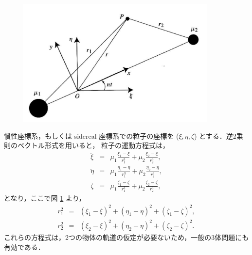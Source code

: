\documentclass[11pt,a4paper,oneside,onecolumn]{jreport}
\begin{document}
\begin{figure}[H]
\centering
\includegraphics[width=10cm]{./image/sec3_1.pdf}
\caption{\label{fig:xi_eta_zeta}}
\end{figure}

慣性座標系，もしくは sidereal 座標系での粒子の座標を ($\xi, \eta, \zeta$) とする．逆2乗則のベクトル形式を用いると，
粒子の運動方程式は，
\begin{eqnarray}
\ddot{\xi} & = & \mu_1 \frac{\xi_1 - \xi}{r_1^3} + \mu_2 \frac{\xi_2 - \xi}{r_2^3}, \label{eq:xiddot}\\
\ddot{\eta} & = & \mu_1 \frac{\eta_1 - \eta}{r_1^3} + \mu_2 \frac{\eta_2 - \eta}{r_2^3}, \label{eq:etaddot}\\
\ddot{\zeta} & = & \mu_1 \frac{\zeta_1 - \zeta}{r_1^3} + \mu_2 \frac{\zeta_2 - \zeta}{r_2^3}, \label{eq:zetaddot}
\end{eqnarray}
となり，ここで図 \ref{fig:xi_eta_zeta} より，
\begin{eqnarray}
r_1^2 & = & (\xi_1 - \xi)^2 + (\eta_1 - \eta)^2 + (\zeta_1 - \zeta)^2,\\
r_2^2 & = & (\xi_2 - \xi)^2 + (\eta_2 - \eta)^2 + (\zeta_2 - \zeta)^2.
\end{eqnarray}
これらの方程式は，2つの物体の軌道の仮定が必要ないため，一般の3体問題にも有効である．
\end{document}
